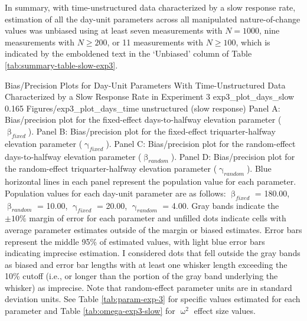\documentclass[
12pt, %
twoside,
english]{guelphthesis}
\begin{document}
In summary, with time-unstructured data characterized by a slow response rate, estimation of all the day-unit parameters across all manipulated nature-of-change values was unbiased using at least seven measurements with \(N = 1000\), nine measurements with \(N \ge 200\), or 11 measurements with \(N \ge 100\), which is indicated by the emboldened text in the `Unbiased' column of Table \ref{tab:summary-table-slow-exp3}.
\begin{apaFigure}
[portrait]
[samepage]
[-0.2cm]
{Bias/Precision Plots for Day-Unit Parameters With Time-Unstructured Data Characterized by a Slow Response Rate in Experiment 3}
{exp3_plot_days_slow}
{0.165}
{Figures/exp3_plot_days_time unstructured (slow response)}
{Panel A: Bias/precision plot for the fixed-effect days-to-halfway elevation parameter ($\upbeta_{fixed}$). Panel B: Bias/precision plot for the fixed-effect triquarter-halfway elevation parameter ($\upgamma_{fixed}$). Panel C: Bias/precision plot for the random-effect days-to-halfway elevation parameter ($\upbeta_{random}$). Panel D: Bias/precision plot for the random-effect triquarter-halfway elevation parameter ($\upgamma_{random}$). Blue horizontal lines in each panel represent the population value for each parameter. Population values for each day-unit parameter are as follows: $\upbeta_{fixed}$ = 180.00, $\upbeta_{random}$ = 10.00, $\upgamma_{fixed}$ = 20.00, $\upgamma_{random}$ = 4.00. Gray bands indicate the $\pm 10\%$ margin of error for each parameter and unfilled dots indicate cells with average parameter estimates outside of the margin or biased estimates. Error bars represent the middle 95\% of estimated values, with light blue error bars indicating imprecise estimation. I considered dots that fell outside the gray bands as biased and error bar lengths with at least one whisker length exceeding the 10\% cutoff (i.e., or longer than the portion of the gray band underlying the whisker) as imprecise. Note that random-effect parameter units are in standard deviation units. See Table \ref{tab:param-exp-3} for specific values estimated for each parameter and Table \ref{tab:omega-exp3-slow} for $\upomega^2$ effect size values.}
\end{apaFigure}
\end{document}
